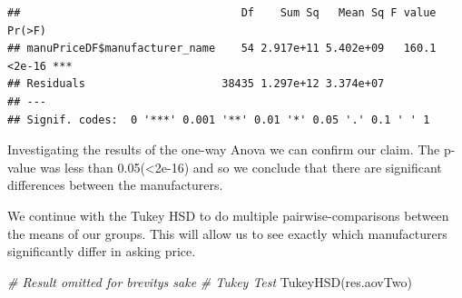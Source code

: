 \documentclass[
]{article}
\newenvironment{Shaded}{\begin{snugshade}}{\end{snugshade}}
\newcommand{\AttributeTok}[1]{\textcolor[rgb]{0.77,0.63,0.00}{#1}}
\newcommand{\CommentTok}[1]{\textcolor[rgb]{0.56,0.35,0.01}{\textit{#1}}}
\newcommand{\ConstantTok}[1]{\textcolor[rgb]{0.00,0.00,0.00}{#1}}
\newcommand{\FunctionTok}[1]{\textcolor[rgb]{0.00,0.00,0.00}{#1}}
\newcommand{\NormalTok}[1]{#1}
\newcommand{\OtherTok}[1]{\textcolor[rgb]{0.56,0.35,0.01}{#1}}
\newcommand{\SpecialCharTok}[1]{\textcolor[rgb]{0.00,0.00,0.00}{#1}}
\begin{document}
\begin{Shaded}
\end{Shaded}

\begin{verbatim}
##                                  Df    Sum Sq   Mean Sq F value Pr(>F)    
## manuPriceDF$manufacturer_name    54 2.917e+11 5.402e+09   160.1 <2e-16 ***
## Residuals                     38435 1.297e+12 3.374e+07                   
## ---
## Signif. codes:  0 '***' 0.001 '**' 0.01 '*' 0.05 '.' 0.1 ' ' 1
\end{verbatim}

Investigating the results of the one-way Anova we can confirm our claim.
The p-value was less than 0.05(\textless2e-16) and so we conclude that
there are significant differences between the manufacturers.

We continue with the Tukey HSD to do multiple pairwise-comparisons
between the means of our groups. This will allow us to see exactly which
manufacturers significantly differ in asking price.

\begin{Shaded}
\begin{Highlighting}[]
\CommentTok{\# Result omitted for brevity\textquotesingle{}s sake}
\CommentTok{\# Tukey Test}
\FunctionTok{TukeyHSD}\NormalTok{(res.aovTwo)}
\end{Highlighting}
\end{Shaded}
\end{document}

